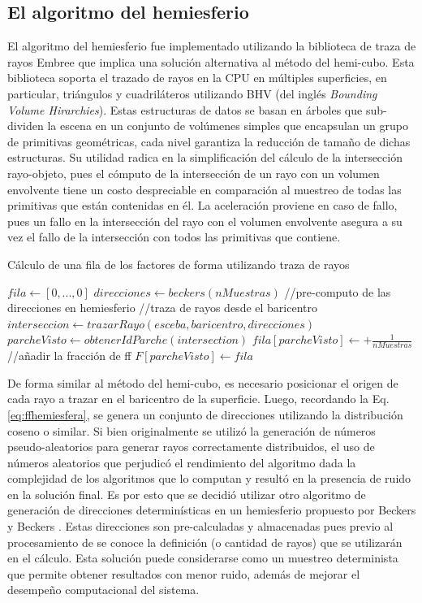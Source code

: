 \subsection{El algoritmo del hemiesferio}
El algoritmo del hemiesferio fue implementado utilizando la biblioteca de traza de rayos Embree que implica una solución alternativa al método del hemi-cubo. Esta biblioteca soporta el trazado de rayos en la CPU en múltiples superficies, en particular, triángulos y cuadriláteros utilizando BHV (del inglés \textit{Bounding Volume Hirarchies}). Estas estructuras de datos se basan en árboles que sub-dividen la escena en un conjunto de volúmenes simples que encapsulan un grupo de primitivas geométricas, cada nivel garantiza la reducción de tamaño de dichas estructuras. Su utilidad radica en la simplificación del cálculo de la intersección rayo-objeto, pues el cómputo de la intersección de un rayo con un volumen envolvente tiene un costo despreciable en comparación al muestreo de todas las primitivas que están contenidas en él. La aceleración proviene en caso de fallo, pues un fallo en la intersección del rayo con el volumen envolvente asegura a su vez el fallo de la intersección con todos las primitivas que contiene.

\begin{algorithm}
	\caption{Cálculo de una fila de los factores de forma utilizando traza de rayos}
	\label{alg:computeff}
	\fontsize{8}{8}\selectfont
	\begin{algorithmic}
			\State $fila \gets [0,...,0]$
			\State $direcciones \gets beckers(nMuestras)$ //pre-computo de las direcciones en hemiesferio
			//traza de rayos desde el baricentro
			\State $interseccion \gets trazarRayo(esceba, baricentro, direcciones)$ 
			\State $parcheVisto \gets obtenerIdParche(intersection)$
			\State $fila[parcheVisto] \gets + \frac{1}{nMuestras}$ //añadir la fracción de ff
			\EndIf
			\EndLoop
			\State $F[parcheVisto] \gets  fila$
		\EndFunction
	\end{algorithmic}
\end{algorithm}

De forma similar al método del hemi-cubo, es necesario posicionar el origen de cada rayo a trazar en el baricentro de la superficie. Luego, recordando la Eq. \eqref{eq:ffhemiesfera}, se genera un conjunto de direcciones utilizando la distribución coseno o similar. Si bien originalmente se utilizó la generación de números pseudo-aleatorios para generar rayos correctamente distribuidos, el uso de números aleatorios que perjudicó el rendimiento del algoritmo dada la complejidad de los algoritmos que lo computan y resultó en la presencia de ruido en la solución final. Es por esto que se decidió utilizar otro algoritmo de generación de direcciones determinísticas en un hemiesferio propuesto por Beckers y Beckers \cite{Beckers}. Estas direcciones son pre-calculadas y almacenadas pues previo al procesamiento de se conoce la definición (o cantidad de rayos) que se utilizarán en el cálculo. Esta solución puede considerarse como un muestreo determinista que permite obtener resultados con menor ruido, además de mejorar el desempeño computacional del sistema.

